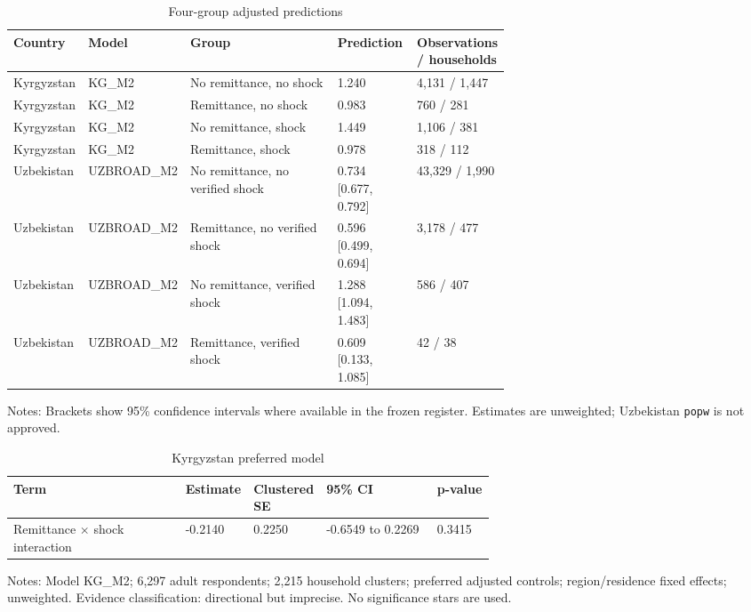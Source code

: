 \documentclass[11pt]{article}
\begin{document}
\clearpage

\begin{table}[!htbp]
\centering
\caption{Four-group adjusted predictions}
\label{tab:fourgroups}
\footnotesize
\setlength{\tabcolsep}{5pt}
\begin{tabularx}{\linewidth}{p{0.15\linewidth} p{0.16\linewidth} X p{0.16\linewidth} p{0.18\linewidth}}
\toprule
Country & Model & Group & Prediction & Observations / households \\
\midrule
Kyrgyzstan & KG\_M2 & No remittance, no shock & 1.240 & 4,131 / 1,447 \\
Kyrgyzstan & KG\_M2 & Remittance, no shock & 0.983 & 760 / 281 \\
Kyrgyzstan & KG\_M2 & No remittance, shock & 1.449 & 1,106 / 381 \\
Kyrgyzstan & KG\_M2 & Remittance, shock & 0.978 & 318 / 112 \\
Uzbekistan & UZBROAD\_M2 & No remittance, no verified shock & 0.734 [0.677, 0.792] & 43,329 / 1,990 \\
Uzbekistan & UZBROAD\_M2 & Remittance, no verified shock & 0.596 [0.499, 0.694] & 3,178 / 477 \\
Uzbekistan & UZBROAD\_M2 & No remittance, verified shock & 1.288 [1.094, 1.483] & 586 / 407 \\
Uzbekistan & UZBROAD\_M2 & Remittance, verified shock & 0.609 [0.133, 1.085] & 42 / 38 \\
\bottomrule
\end{tabularx}
\begin{minipage}{0.95\linewidth}\footnotesize Notes: Brackets show 95\% confidence intervals where available in the frozen register. Estimates are unweighted; Uzbekistan \texttt{popw} is not approved.\end{minipage}
\end{table}

\clearpage

\begin{table}[!htbp]
\centering
\caption{Kyrgyzstan preferred model}
\label{tab:kgmodel}
\footnotesize
\begin{tabularx}{\linewidth}{X p{0.14\linewidth} p{0.14\linewidth} p{0.23\linewidth} p{0.12\linewidth}}
\toprule
Term & Estimate & Clustered SE & 95\% CI & p-value \\
\midrule
Remittance $\times$ shock interaction & -0.2140 & 0.2250 & -0.6549 to 0.2269 & 0.3415 \\
\bottomrule
\end{tabularx}
\begin{minipage}{0.95\linewidth}\footnotesize Notes: Model KG\_M2; 6,297 adult respondents; 2,215 household clusters; preferred adjusted controls; region/residence fixed effects; unweighted. Evidence classification: directional but imprecise. No significance stars are used.\end{minipage}
\end{table}
\end{document}
